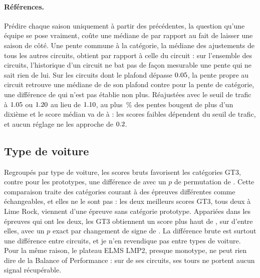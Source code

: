 \documentclass[11pt,a4paper]{article}
\begin{document}
\paragraph{Références.} Prédire chaque saison uniquement à partir des
précédentes, la question qu'une équipe se pose vraiment, coûte une médiane de
\BasePastDiff{} \BasePastDiffCi{} par rapport au fait de laisser une saison de
côté. Une pente commune à la catégorie, la médiane des ajustements de tous les
autres circuits, obtient \BaseCategoryDiff{} \BaseCategoryDiffCi{} par rapport à
celle du circuit : sur l'ensemble des circuits, l'historique d'un circuit ne bat
pas de façon mesurable une pente qui ne sait rien de lui. Sur les
\CeilingShareN{} circuits dont le plafond dépasse $0.05{}$, la
pente propre au circuit retrouve une médiane de \CeilingShareMedian{} de son
plafond contre \CeilingShareCategory{} pour la pente de catégorie, une
différence de \CeilingCategoryDiff{} \CeilingCategoryDiffCi{} qui n'est pas
établie non plus. Réajustées avec le seuil de trafic à $1.05{}$ ou
$1.20{}$ au lieu de $1.10{}$, au plus \TrimShareMoved{}\,\% des
pentes bougent de plus d'un dixième et le score médian va de \TrimLoroLow{} à
\TrimLoroHigh{} : les scores faibles dépendent du seuil de trafic, et aucun
réglage ne les approche de $0.2{}$.

\subsection{Type de voiture}

Regroupés par type de voiture, les scores bruts favorisent les catégories GT3,
\GTThreeMean{} contre \ProtoMean{} pour les prototypes, une différence de
\TransferDiff{} \TransferDiffCI{} avec un $p$ de permutation de \TransferP{}.
Cette comparaison traite des catégories courant à des épreuves différentes comme
échangeables, et elles ne le sont pas : les deux meilleurs scores GT3, tous deux
à Lime Rock, viennent d'une épreuve sans catégorie prototype. Appariées dans les
\GtPairEvents{} épreuves qui ont les deux, les GT3 obtiennent un score plus haut
de \GtPairDiff{} \GtPairDiffCi{}, sur \GtPairHigher{} d'entre elles, avec un $p$
exact par changement de signe de \GtPairP{}. La différence brute est surtout une
différence entre circuits, et je n'en revendique pas entre types de voiture.
Pour la même raison, le plateau ELMS LMP2, presque monotype, ne peut rien dire de
la Balance of Performance : sur \NLmptwoNoSignal{} de ses \NLmptwoTotal{}
circuits, ses tours ne portent aucun signal récupérable.
\end{document}
